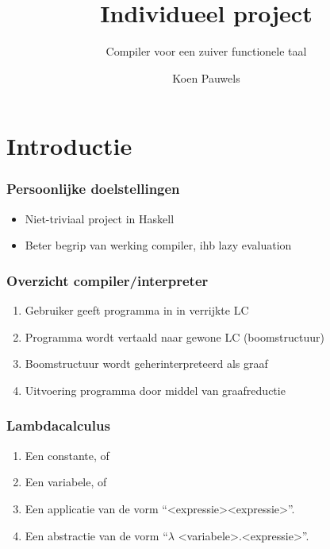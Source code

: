 \documentclass{beamer}
\begin{document}
\lstset{language=Haskell}
\title{Individueel project}
\subtitle{Compiler voor een zuiver functionele taal}
\author{Koen Pauwels}
\maketitle

\section{Introductie}

\begin{frame}
  \frametitle{Persoonlijke doelstellingen}
  \begin{itemize}
  \item Niet-triviaal project in Haskell
  \item Beter begrip van werking compiler, ihb lazy evaluation
  \end{itemize}
\end{frame}

\begin{frame}
  \frametitle{Overzicht compiler/interpreter}
  \begin{enumerate}
  \item Gebruiker geeft programma in in verrijkte LC
  \item Programma wordt vertaald naar gewone LC (boomstructuur)
  \item Boomstructuur wordt geherinterpreteerd als graaf
  \item Uitvoering programma door middel van graafreductie
  \end{enumerate}
\end{frame}

\begin{frame}
  \frametitle{Lambdacalculus}
  \begin{enumerate}
  \item Een constante, of
  \item Een variabele, of
  \item Een applicatie van de vorm ``\textless expressie\textgreater \textless expressie\textgreater''.
  \item Een abstractie van de vorm ``$\lambda$ \textless variabele\textgreater .\textless expressie\textgreater''.
  \end{enumerate}
\end{frame}
\end{document}
